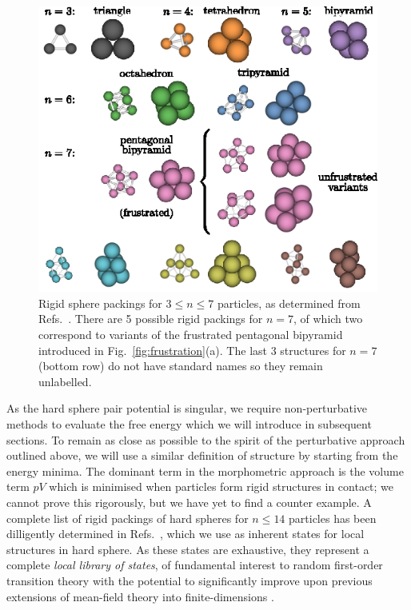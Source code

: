 \documentclass[11pt,twoside]{report}
\begin{document}
\begin{figure}
  \includegraphics[width=0.9\linewidth,outer]{packings}
  \caption[Rigid spherical packings of up to 7 particles]{
    Rigid sphere packings for $3 \le n \le 7$ particles, as determined from Refs.\ \cite{ArkusPRL2009,Holmes-CerfonSR2016}.
    There are 5 possible rigid packings for $n=7$, of which two correspond to variants of the frustrated pentagonal bipyramid introduced in Fig.\ \ref{fig:frustration}(a).
    The last 3 structures for $n=7$ (bottom row) do not have standard names so they remain unlabelled.
  }
  \label{fig:packings}
\end{figure}

As the hard sphere pair potential is singular, we require non-perturbative methods to evaluate the free energy which we will introduce in subsequent sections.
To remain as close as possible to the spirit of the perturbative approach outlined above, we will use a similar definition of structure by starting from the energy minima.
The dominant term in the morphometric approach is the volume term $pV$ which is minimised when particles form rigid structures in contact; we cannot prove this rigorously, but we have yet to find a counter example.
A complete list of rigid packings of hard spheres for $n \le 14$ particles has been dilligently determined in Refs.\ \cite{ArkusPRL2009,Holmes-CerfonSR2016}, which we use as inherent states for local structures in hard sphere.
As these states are exhaustive, they represent a complete \emph{local library of states}, of fundamental interest to random first-order transition theory \cite{LubchenkoARPC2007} with the potential to significantly improve upon previous extensions of mean-field theory into finite-dimensions \cite{BouchaudJCP2004,DzeroPRB2005,FranzJSM2005,AngeliniJSP2017,RulquinJSM2016,BiroliMeanPRB2018,BiroliFinitePRB2018}.
\end{document}
